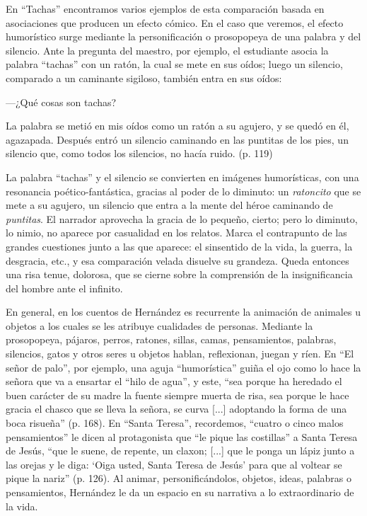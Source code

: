 \documentclass[14pt,twoside,final]{extbook} %
\begin{document}
En ``Tachas'' encontramos varios ejemplos de esta comparación basada en asociaciones que producen un efecto cómico. En el caso que veremos, el efecto humorístico surge mediante la personificación o prosopopeya de una palabra y del silencio. Ante la pregunta del maestro, por ejemplo, el estudiante asocia la palabra ``tachas'' con un ratón, la cual se mete en sus oídos; luego un silencio, comparado a un caminante sigiloso, también entra en sus oídos:
\begin{quoting}
---¿Qué cosas son tachas?

La palabra se metió en mis oídos como un ratón a su agujero, y se quedó en él, agazapada. Después entró un silencio caminando en las puntitas de los pies, un silencio que, como todos los silencios, no hacía ruido. (p. 119)
\end{quoting}
La palabra ``tachas'' y el silencio se convierten en imágenes humorísticas, con una resonancia poético-fantástica, gracias al poder de lo diminuto: un \emph{ratoncito} que se mete a su agujero, un silencio que entra a la mente del héroe caminando de \emph{puntitas}. El narrador aprovecha la gracia de lo pequeño, cierto; pero lo diminuto, lo nimio, no aparece por casualidad en los relatos. Marca el contrapunto de las grandes cuestiones junto a las que aparece: el sinsentido de la vida, la guerra, la desgracia, etc., y esa comparación velada disuelve su grandeza. Queda entonces una risa tenue, dolorosa, que se cierne sobre la comprensión de la insignificancia del hombre ante el infinito.

En general, en los cuentos de Hernández es recurrente la animación de animales u objetos a los cuales se les atribuye cualidades de personas. Mediante la prosopopeya, pájaros, perros, ratones, sillas, camas, pensamientos, palabras, silencios, gatos y otros seres u objetos hablan, reflexionan, juegan y ríen. En ``El señor de palo'', por ejemplo, una aguja ``humorística'' guiña el ojo como lo hace la señora que va a ensartar el ``hilo de agua'', y este, ``sea porque ha heredado el buen carácter de su madre la fuente siempre muerta de risa, sea porque le hace gracia el chasco que se lleva la señora, se curva [...] adoptando la forma de una boca risueña'' (p. 168). En ``Santa Teresa'', recordemos, ``cuatro o cinco malos pensamientos'' le dicen al protagonista que ``le pique las costillas'' a Santa Teresa de Jesús, ``que le suene, de repente, un claxon; [...] que le ponga un lápiz junto a las orejas y le diga: `Oiga usted, Santa Teresa de Jesús' para que al voltear se pique la nariz'' (p. 126). Al animar, personificándolos, objetos, ideas, palabras o pensamientos, Hernández le da un espacio en su narrativa a lo extraordinario de la vida.
\end{document}
